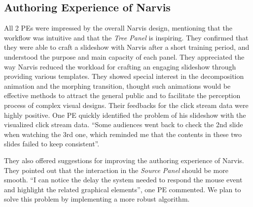 \subsection{Authoring Experience of Narvis}
All 2 PEs were impressed by the overall Narvis design, mentioning that the workflow was intuitive and that the \textit{Tree Panel} is inspiring. They confirmed that they were able to craft a slideshow with Narvis after a short training period, and understood the purpose and main capacity of each panel. 
They appreciated the way Narvis reduced the workload for crafting an engaging slideshow through providing various templates. They showed special interest in the decomposition animation and the morphing transition, thought such animations would be effective methods to attract the general public and to facilitate the perception process of complex visual designs.  
Their feedbacks for the  click stream data were highly positive. One PE quickly identified the problem of his slideshow with the visualized click stream data. ``Some audiences went back to check the 2nd  slide when watching the 3rd  one, which reminded me that the contents in these two slides failed to keep consistent''.

They also offered suggestions for improving the authoring experience of Narvis. They pointed out that the interaction in the \textit{Source Panel} should be more smooth. ``I can notice the delay the system needed to respond the mouse event and highlight the related graphical elements'', one PE commented. We plan to solve this problem by implementing a more robust algorithm. 

